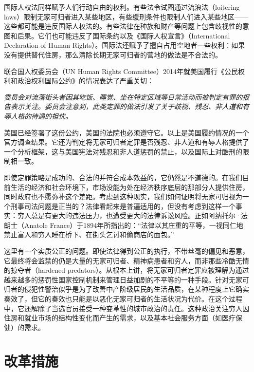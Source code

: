 \documentclass[fontset=fandol, a4paper, 12pt, openright]{ctexbook}
\renewenvironment{quote}
  {\list{}{\rightmargin\leftmargin}%
   \item\relax\small\itshape\color{black}}
  {\endlist}
\begin{document}
国际人权法同样赋予人们行动自由的权利。有些法令试图通过流浪法（loitering laws）限制无家可归者进入某些地区，有些缓刑条件也限制人们进入某些地区——这些都可能是违反国际人权法的。有些法律在种族和财产等问题上包含歧视性的意图和后果。它们也可能违反了国际条约以及《国际人权宣言》（International Declaration of Human Rights）。国际法还赋予了擅自占用空地者一些权利：如果没有提供替代住房，那么清除长期无家可归者的营地的做法是不合法的。

联合国人权委员会（UN Human Rights Committee）2014年就美国履行《公民权利和政治权利国际公约》的情况表达了严重关切：

\begin{quote}
委员会对流落街头者因其吃饭、睡觉、坐在特定区域等日常活动而被判定有罪的报告表示关注。委员会注意到，此类定罪的做法引发了关于歧视、残忍、非人道和有辱人格的待遇的担忧。
\end{quote}

美国已经签署了这份公约，美国的法院也必须遵守它。以上是美国履约情况的一个官方调查结果。它还为判定将无家可归者定罪是否残忍、非人道和有辱人格提供了一个分析框架，这与美国宪法对残忍和非人道惩罚的禁止，以及国际上对酷刑的限制相一致。

即使定罪策略是成功的、合法的并符合成本效益的，它仍然是不道德的。在我们目前生活的经济和社会环境下，市场没能为处在经济秩序底层的那部分人提供住房，同时政府也不愿弥补这个差距。考虑到这种现实，我们如何证明将无家可归视为一个刑事司法问题是正当的？法律看起来是普遍适用的，但没有考虑到这样一个事实：穷人总是有更大的违法压力，也遭受更大的法律诉讼风险。正如阿纳托尔·法朗士（Anatole France）于1894年所指出的：“法律以其庄重的平等，一视同仁地禁止富人和穷人睡在桥下、在街头乞讨和偷商店的面包。”

这里有一个实质公正的问题。即使法律得到公正的执行，不带丝毫的偏见和恶意，它最终将会监禁的仍是大量的无家可归者、精神病患者和穷人，而非那些冷酷无情的掠夺者（hardened predators）。从根本上讲，将无家可归者定罪应被理解为通过越来越多的惩罚性国家控制机制来管理日益加剧的不平等的一种手段。针对无家可归者的侵犯性警治似乎是为了改善中产阶级居民的生活品质，在某种程度上它确实奏效了，但它的奏效也只能是以恶化无家可归者的生活状况为代价。在这个过程中，它还解除了当选官员接受一种变革性的城市政治的责任。这种政治关注穷人因住房和就业市场的结构性变化而产生的需求，以及基本社会服务方面（如医疗保健）的需求。

\section{改革措施}
\end{document}
